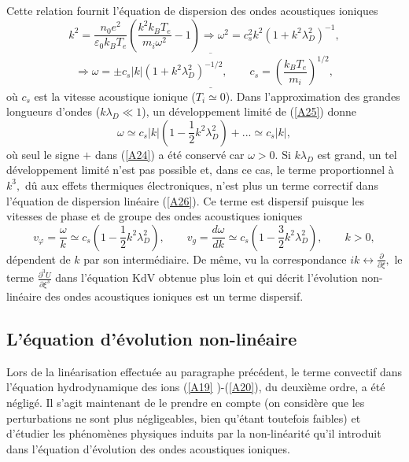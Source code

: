 \documentclass[10pt,thmsa]{article}
\begin{document}
Cette relation fournit l'\'{e}quation de dispersion des ondes acoustiques
ioniques
\begin{equation}
k^{2}=\frac{n_{0}e^{2}}{\varepsilon_{0}k_{B}T_{e}}(\frac{k^{2}k_{B}T_{e}%
}{m_{i}\omega^{2}}-1)\Rightarrow\omega^{2}=c_{s}^{2}k^{2}(1+k^{2}\lambda
_{D}^{2})^{-1},\label{A24}%
\end{equation}%
\begin{equation}
\Rightarrow\overline{\underline{\omega=\pm c_{s}\left\vert k\right\vert
(1+k^{2}\lambda_{D}^{2})^{-1/2},\qquad c_{s}=\left(  \frac{k_{B}T_{e}}{m_{i}%
}\right)  ^{1/2}}},\label{A25}%
\end{equation}
o\`{u} $c_{s}$ est la vitesse acoustique ionique ($T_{i}\simeq0$). Dans
l'approximation des grandes longueurs d'ondes ($k\lambda_{D}\ll1$), un
d\'{e}veloppement limit\'{e} de (\ref{A25}) donne
\begin{equation}
\omega\simeq c_{s}\left\vert k\right\vert (1-\frac{1}{2}k^{2}\lambda_{D}%
^{2})+...\simeq c_{s}\left\vert k\right\vert ,\label{A26}%
\end{equation}
o\`{u} seul le signe $+$ dans (\ref{A24}) a \'{e}t\'{e} conserv\'{e} car
$\omega>0$. Si $k\lambda_{D}$ est grand, un tel d\'{e}veloppement limit\'{e}
n'est pas possible et, dans ce cas, le terme proportionnel \`{a} $k^{3},$
d\^{u} aux effets thermiques \'{e}lectroniques, n'est plus un terme correctif
dans l'\'{e}quation de dispersion lin\'{e}aire (\ref{A26}). Ce terme est
dispersif puisque les vitesses de phase et de groupe des ondes acoustiques
ioniques
\begin{equation}
v_{\varphi}=\frac{\omega}{k}\simeq c_{s}(1-\frac{1}{2}k^{2}\lambda_{D}%
^{2}),\qquad v_{g}=\frac{d\omega}{dk}\simeq c_{s}(1-\frac{3}{2}k^{2}%
\lambda_{D}^{2}),\qquad k>0,\label{AA26}%
\end{equation}
d\'{e}pendent de $k$ par son interm\'{e}diaire. De m\^{e}me, vu la
correspondance $ik\leftrightarrow\frac{\partial}{\partial\xi},$ le terme
$\frac{\partial^{3}U}{\partial\xi^{3}}$ dans l'\'{e}quation KdV obtenue plus
loin et qui d\'{e}crit l'\'{e}volution non-lin\'{e}aire des ondes acoustiques
ioniques est un terme dispersif.

\subsection{L'\'{e}quation d'\'{e}volution non-lin\'{e}aire}

Lors de la lin\'{e}arisation effectu\'{e}e au paragraphe pr\'{e}c\'{e}dent, le
terme convectif dans l'\'{e}quation hydrodynamique des ions (\ref{A19}%
)-(\ref{A20}), du deuxi\`{e}me ordre, a \'{e}t\'{e} n\'{e}glig\'{e}. Il s'agit
maintenant de le prendre en compte (on consid\`{e}re que les perturbations ne
sont plus n\'{e}gligeables, bien qu'\'{e}tant toutefois faibles) et
d'\'{e}tudier les ph\'{e}nom\`{e}nes physiques induits par la
non-lin\'{e}arit\'{e} qu'il introduit dans l'\'{e}quation d'\'{e}volution des
ondes acoustiques ioniques.
\end{document}
